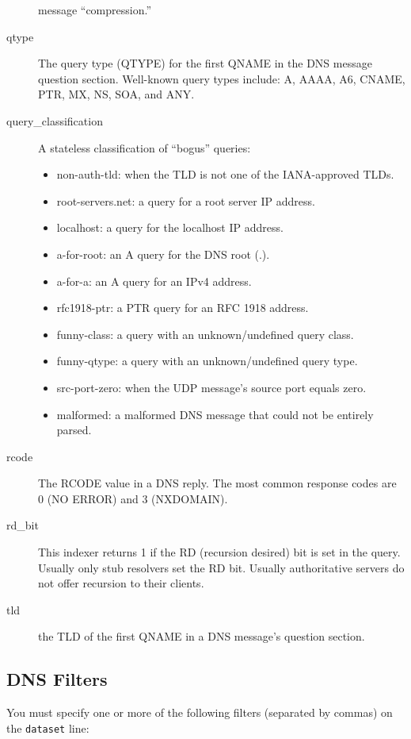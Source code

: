 \documentclass{report}
\begin{document}
\begin{description}
	message ``compression.''
\item[qtype]
	The query type (QTYPE) for the first QNAME in the DNS message
	question section.  Well-known query types include: A, AAAA,
	A6, CNAME, PTR, MX, NS, SOA, and ANY.
\item[query\_classification]
	A stateless classification of ``bogus'' queries:
	\begin{itemize}
	\setlength{\itemsep}{0ex plus 0.5ex minus 0.0ex}
	\item non-auth-tld: when the TLD is not one of the IANA-approved TLDs.
	\item root-servers.net: a query for a root server IP address.
	\item localhost: a query for the localhost IP address.
	\item a-for-root: an A query for the DNS root (.).
	\item a-for-a: an A query for an IPv4 address.
	\item rfc1918-ptr: a PTR query for an RFC 1918 address.
	\item funny-class: a query with an unknown/undefined query class.
	\item funny-qtype: a query with an unknown/undefined query type.
	\item src-port-zero: when the UDP message's source port equals zero.
	\item malformed: a malformed DNS message that could not be entirely parsed.
	\end{itemize}
\item[rcode]
	The RCODE value in a DNS reply.  The most common response
	codes are 0 (NO ERROR) and 3 (NXDOMAIN). 
\item[rd\_bit]
	This indexer returns 1 if the RD (recursion desired) bit is
	set in the query.  Usually only stub resolvers set the RD bit.
	Usually authoritative servers do not offer recursion to their
	clients.
\item[tld]
	the TLD of the first QNAME in a DNS message's question section.
\end{description}

\subsection{DNS Filters}

You must specify one or more of the following filters (separated by commas) on
the {\tt dataset\/} line:
\end{document}
